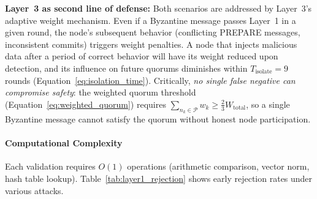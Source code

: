 \documentclass[manuscript,screen,review]{acmart}
\begin{document}
\textbf{Layer~3 as second line of defense:} Both scenarios are addressed by Layer~3's adaptive weight mechanism. Even if a Byzantine message passes Layer~1 in a given round, the node's subsequent behavior (conflicting PREPARE messages, inconsistent commits) triggers weight penalties. A node that injects malicious data after a period of correct behavior will have its weight reduced upon detection, and its influence on future quorums diminishes within $T_{\text{isolate}} = 9$ rounds (Equation~\ref{eq:isolation_time}). Critically, \textit{no single false negative can compromise safety}: the weighted quorum threshold (Equation~\ref{eq:weighted_quorum}) requires $\sum_{n_k \in \mathcal{P}} w_k \geq \frac{2}{3} W_{\text{total}}$, so a single Byzantine message cannot satisfy the quorum without honest node participation.

\paragraph{Computational Complexity}

Each validation requires $O(1)$ operations (arithmetic comparison, vector norm, hash table lookup). Table~\ref{tab:layer1_rejection} shows early rejection rates under various attacks.

\begin{table}[h]
\centering
\caption{Layer 1 Early Rejection Rate Under Byzantine Attacks}
\label{tab:layer1_rejection}
\small
{}
\end{table}
\end{document}
